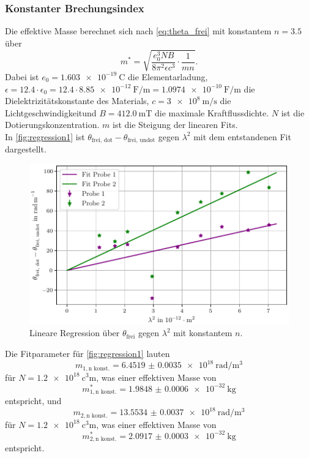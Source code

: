 \subsubsection{Konstanter Brechungsindex}
Die effektive Masse berechnet sich nach \autoref{eq:theta_frei} mit konstantem $n = \num{3,5}$ über
\begin{equation}
    m^* = \sqrt{\frac{e_0^3 N B}{8 \pi^2 \epsilon c^3} \cdot \frac{1}{mn}}.
\label{eq:masse}
\end{equation}
Dabei ist $e_0 = \qty{1.603e-19}{\coulomb}$ die Elementarladung, $\epsilon = \num{12.4} \cdot \epsilon_0 = \num{12.4} \cdot \qty{8.85e-12}{\farad\per\meter} = \qty{1.0974e-10}{\farad\per\meter}$ die Dielektrizitätskonstante des Materials,
$c= \qty{3e8}{\meter\per\second}$ die Lichtgeschwindigkeitund $B= \qty{412.0}{\milli\tesla}$ die maximale Kraftflussdichte. $N$ ist die Dotierungskonzentration. $m$ ist die Steigung der linearen Fits.\\
In \autoref{fig:regression1} ist $\theta_\text{frei, dot} - \theta_\text{frei, undot}$ gegen $\lambda^2$ mit dem entstandenen Fit dargestellt.
\begin{figure}
    \centering
    \includegraphics[width=\textwidth]{plots/fits_ohne_n.pdf}
    \caption{Lineare Regression über $\theta_\text{frei}$ gegen $\lambda^2$ mit konstantem $n$.}
    \label{fig:regression1}
\end{figure}
Die Fitparameter für \autoref{fig:regression1} lauten
\begin{equation*}
    m_{1, \text{n konst.}} = \qty{6.4519(35)e18}{\radian\per\meter\cubed} 
\end{equation*}
für $N = \qty{1.2e18}{\cubic\centi\meter}$, was einer effektiven Masse von 
\begin{equation*}
    m^*_{1, \text{n konst.}} = \qty{1.9848(6)e-32}{\kilo\gram}
\end{equation*}
entspricht, und
\begin{equation*}
    m_{2, \text{n konst.}} = \qty{13.5534(37)e18}{\radian\per\meter\cubed} 
\end{equation*}
für $N = \qty{1.2e18}{\cubic\centi\meter}$, was einer effektiven Masse von 
\begin{equation*}
    m^*_{2, \text{n konst.}} = \qty{2.0917(3)e-32}{\kilo\gram}
\end{equation*}
entspricht.


